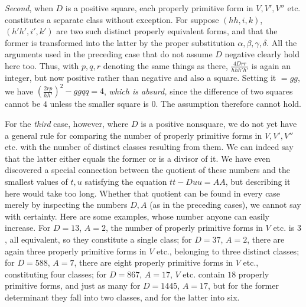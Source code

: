 \textit{Second}, when \(D\) is a positive square, each properly primitive form in \(V,V',V''\) etc. constitutes a separate class without exception. For suppose \((hh,i,k)\), \((h'h',i',k')\) are two such distinct properly equivalent forms, and that the former is transformed into the latter by the proper substitution \(\alpha,\beta,\gamma,\delta\). All the arguments used in the preceding case that do not assume \(D\) negative clearly hold here too. Thus, with \(p,q,r\)
denoting the same things as there, \(\frac{4Drr}{hhh'h'}\) is again an integer, but now positive rather than negative and also a square. Setting it \(=gg\), we have \((\frac{2rp}{hh'})^2-ggqq=4\), \textit{which is absurd,} since the difference of two squares cannot be \(4\) unless the smaller square is \(0\). The assumption therefore cannot hold.

For the \textit{third} case, however, where \(D\) is a positive nonsquare, we do not yet have a general rule for comparing the number of properly primitive forms in \(V,V',V''\) etc. with the number of distinct classes resulting from them. We can indeed say that the latter either equals the former or is a divisor of it. We have even discovered a special connection between the quotient of these numbers and the smallest values of \(t,u\) satisfying the equation \(tt-Duu=AA\), but describing it here would take too long. Whether that quotient can be found in every case merely by inspecting the numbers \(D,A\) (as in the preceding cases), we cannot say with certainty. Here are some examples, whose number anyone can easily increase. For \(D=13\), \(A=2\), the number of properly primitive forms in \(V\) etc. is \(3\), all equivalent, so they constitute a single class; for \(D=37\), \(A=2\), there are again three properly primitive forms in \(V\) etc., belonging to three distinct classes; for \(D=588\), \(A=7\), there are eight properly primitive forms in \(V\) etc., constituting four classes; for \(D=867\), \(A=17\), \(V\) etc. contain \(18\) properly primitive forms, and just as many for \(D=1445\), \(A=17\), but for the former determinant they fall into two classes, and for the latter into six.


